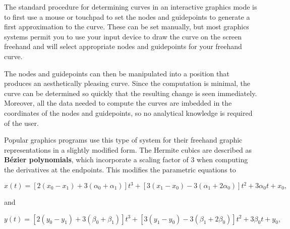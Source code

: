 %
%
The standard procedure for determining curves in an interactive graphics mode is to first use a mouse or touchpad to set the nodes and guidepoints to generate a first approximation to the curve. These can be set manually, but most graphics systems permit you to use your input device to draw the curve on the screen freehand and will select appropriate nodes and guidepoints for your freehand curve.

The nodes and guidepoints can then be manipulated into a position that produces an aesthetically pleasing curve. Since the computation is minimal, the curve can be determined so quickly that the resulting change is seen immediately. Moreover, all the data needed to compute the curves are imbedded in the coordinates of the nodes and guidepoints, so no analytical knowledge is required of the user.

Popular graphics programs use this type of system for their freehand graphic representations in a slightly modified form. The Hermite cubics are described as {\bf Bézier polynomials}, which incorporate a scaling factor of $3$ when computing the derivatives at the endpoints. This modifies the parametric equations to


\begin{equation}\label{eqn:paramet3}
x(t)=\left[2\left(x_{0}-x_{1}\right)+3\left(\alpha_{0}+\alpha_{1}\right)\right] t^{3}+\left[3\left(x_{1}-x_{0}\right)-3\left(\alpha_{1}+2 \alpha_{0}\right)\right] t^{2}+3 \alpha_{0} t+x_{0}, 
\end{equation}


and


\begin{equation}\label{eqn:paramet4}
y(t)=\left[2\left(y_{0}-y_{1}\right)+3\left(\beta_{0}+\beta_{1}\right)\right] t^{3}+\left[3\left(y_{1}-y_{0}\right)-3\left(\beta_{1}+2 \beta_{0}\right)\right] t^{2}+3 \beta_{0} t+y_{0}, \tag{3.26}
\end{equation}


